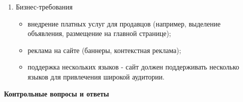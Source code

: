\begin{enumerate}
\begin{itemize}
        \end{itemize}
    \item Бизнес-требования
        \begin{itemize}
            \item внедрение платных услуг для продавцов (например, выделение объявления, размещение на главной странице);
            \item реклама на сайте (баннеры, контекстная реклама);
            \item поддержка нескольких языков - сайт должен поддерживать несколько языков для привлечения широкой аудитории.
        \end{itemize}
\end{enumerate}

\textbf{Контрольные вопросы и ответы}

